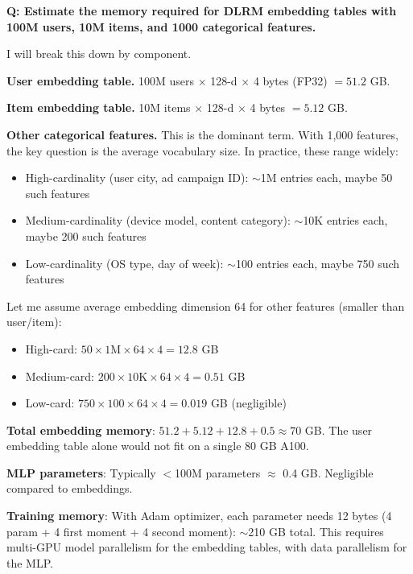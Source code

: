 \begin{interviewq}
\textbf{Q: Estimate the memory required for DLRM embedding tables with 100M users, 10M items, and 1000 categorical features.}

 \quad {} \quad \badgefreq{\freqhigh}

\stronganswer

I will break this down by component.

\textbf{User embedding table.} 100M users $\times$ 128-d $\times$ 4 bytes (FP32) $= 51.2$ GB.

\textbf{Item embedding table.} 10M items $\times$ 128-d $\times$ 4 bytes $= 5.12$ GB.

\textbf{Other categorical features.} This is the dominant term. With 1,000 features, the key question is the average vocabulary size. In practice, these range widely:
\begin{itemize}
    \item High-cardinality (user city, ad campaign ID): $\sim$1M entries each, maybe 50 such features
    \item Medium-cardinality (device model, content category): $\sim$10K entries each, maybe 200 such features
    \item Low-cardinality (OS type, day of week): $\sim$100 entries each, maybe 750 such features
\end{itemize}

Let me assume average embedding dimension 64 for other features (smaller than user/item):
\begin{itemize}
    \item High-card: $50 \times 1\text{M} \times 64 \times 4 = 12.8$ GB
    \item Medium-card: $200 \times 10\text{K} \times 64 \times 4 = 0.51$ GB
    \item Low-card: $750 \times 100 \times 64 \times 4 = 0.019$ GB (negligible)
\end{itemize}

\textbf{Total embedding memory}: $51.2 + 5.12 + 12.8 + 0.5 \approx 70$ GB. The user embedding table alone would not fit on a single 80 GB A100.

\textbf{MLP parameters}: Typically $<$100M parameters $\approx$ 0.4 GB. Negligible compared to embeddings.

\textbf{Training memory}: With Adam optimizer, each parameter needs 12 bytes (4 param + 4 first moment + 4 second moment): $\sim$210 GB total. This requires multi-GPU model parallelism for the embedding tables, with data parallelism for the MLP.


\end{interviewq}
